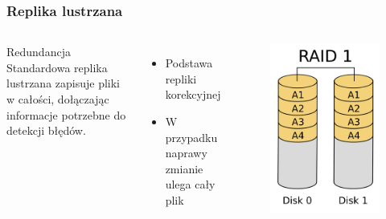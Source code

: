 \documentclass{beamer}
\begin{document}
\begin{frame}
        \frametitle{Replika lustrzana}
	\begin{columns}
		\begin{block}{Redundancja}
                Standardowa replika lustrzana zapisuje pliki w całości, dołączając informacje potrzebne do detekcji błędów.
		\end{block}
		\begin{itemize}
			\item Podstawa repliki korekcyjnej
			\item W przypadku naprawy zmianie ulega cały plik
		\end{itemize}
		\begin{figure}
			\includegraphics[scale=0.4]{raid-1.png}
		\end{figure}
	
	\end{columns}
\end{frame}
	
\end{document}
